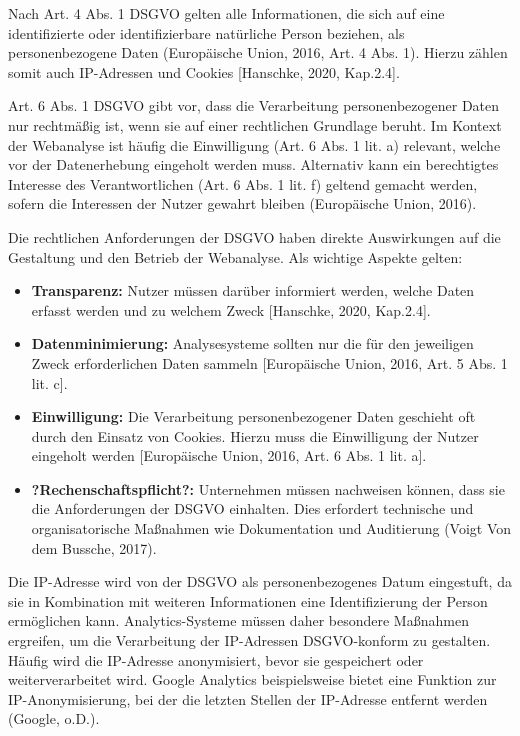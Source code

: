 Nach Art. 4 Abs. 1 DSGVO gelten alle Informationen, die sich auf eine identifizierte oder identifizierbare natürliche Person beziehen, als personenbezogene Daten (Europäische Union, 2016, Art. 4 Abs. 1). Hierzu zählen somit auch IP-Adressen und Cookies [Hanschke, 2020, Kap.2.4].

Art. 6 Abs. 1 DSGVO gibt vor, dass die Verarbeitung personenbezogener Daten nur rechtmäßig ist, wenn sie auf einer rechtlichen Grundlage beruht. Im Kontext der Webanalyse ist häufig die Einwilligung (Art. 6 Abs. 1 lit. a) relevant, welche vor der Datenerhebung eingeholt werden muss. Alternativ kann ein berechtigtes Interesse des Verantwortlichen (Art. 6 Abs. 1 lit. f) geltend gemacht werden, sofern die Interessen der Nutzer gewahrt bleiben (Europäische Union, 2016).

Die rechtlichen Anforderungen der DSGVO haben direkte Auswirkungen auf die Gestaltung und den Betrieb der Webanalyse. Als wichtige Aspekte gelten: 

\begin{itemize}
    \item \textbf{Transparenz:} Nutzer müssen darüber informiert werden, welche Daten erfasst werden und zu welchem Zweck [Hanschke, 2020, Kap.2.4].
    \item \textbf{Datenminimierung:} Analysesysteme sollten nur die für den jeweiligen Zweck erforderlichen Daten sammeln [Europäische Union, 2016, Art. 5 Abs. 1 lit. c].
    \item \textbf{Einwilligung:} Die Verarbeitung personenbezogener Daten geschieht oft durch den Einsatz von Cookies. Hierzu muss die Einwilligung der Nutzer eingeholt werden [Europäische Union, 2016, Art. 6 Abs. 1 lit. a]. 
    \item \textbf{?Rechenschaftspflicht?:} Unternehmen müssen nachweisen können, dass sie die Anforderungen der DSGVO einhalten. Dies erfordert technische und organisatorische Maßnahmen wie Dokumentation und Auditierung (Voigt Von dem Bussche, 2017).
\end{itemize}

Die IP-Adresse wird von der DSGVO als personenbezogenes Datum eingestuft, da sie in Kombination mit weiteren Informationen eine Identifizierung der Person ermöglichen kann. Analytics-Systeme müssen daher besondere Maßnahmen ergreifen, um die Verarbeitung der IP-Adressen DSGVO-konform zu gestalten. Häufig wird die IP-Adresse anonymisiert, bevor sie gespeichert oder weiterverarbeitet wird. Google Analytics beispielsweise bietet eine Funktion zur IP-Anonymisierung, bei der die letzten Stellen der IP-Adresse entfernt werden (Google, o.D.). %


